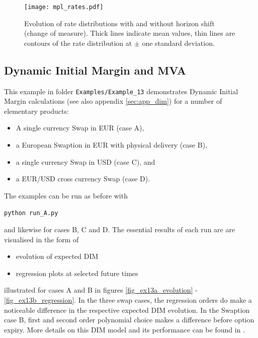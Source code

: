 \documentclass[12pt, a4paper]{article}
\begin{document}
\begin{figure}[h!]
\begin{center}
\texttt{[image: mpl\_rates.pdf]}
\end{center}
\caption{Evolution of rate distributions with and without horizon shift (change of measure). Thick lines indicate mean
  values, thin lines are contours of the rate distribution at $\pm$ one standard deviation.}
\label{fig_15b}
\end{figure}

\subsection{Dynamic Initial Margin and MVA}\label{sec:dim}

This example in folder {\tt Examples/Example\_13} demonstrates Dynamic Initial Margin calculations (see also appendix
\ref{sec:app_dim}) for a number of elementary products:
\begin{itemize}
\item A single currency Swap in EUR (case A), 
\item a European Swaption in EUR with physical delivery (case B), 
\item a single currency Swap in USD (case C), and 
\item a EUR/USD cross currency Swap (case D).
\end{itemize}

The examples can be run as before with 

\medskip
\centerline{\tt python run\_A.py} 

\medskip
and likewise for cases B, C and D. The essential results of each run are are visualised in the form of 
\begin{itemize}
\item evolution of expected DIM
\item regression plots at selected future times 
\end{itemize}
illustrated for cases A and B in figures \ref{fig_ex13a_evolution} - \ref{fig_ex13b_regression}. 
In the three swap cases, the regression orders do make a noticeable difference in the respective expected DIM evolution. In the Swaption case B, first and second order polynomial choice makes a difference before option expiry. More details on this DIM model and its performance can be found in \cite{Anfuso2016,LichtersEtAl}.
 
\end{document}
